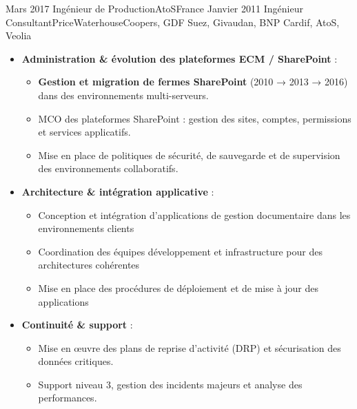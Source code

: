 \begin{experiences}
\consultantexperience
    {Mars 2017}       {Ingénieur de Production}{AtoS}{France}
    {Janvier 2011}    {Ingénieur Consultant}{PriceWaterhouseCoopers, GDF Suez, Givaudan, BNP Cardif, AtoS, Veolia} {
        \begin{itemize}[left=0pt,label={},itemsep=0.4em]
        \vspace{0.3em}  %
          \item \textbf{Administration \& évolution des plateformes ECM / SharePoint} :
            \begin{itemize}[itemsep=0.15em,topsep=0.1em,parsep=0pt]
              \small
              \item \textbf{Gestion et migration de fermes SharePoint} (2010 → 2013 → 2016) dans des environnements multi-serveurs.
              \item MCO des plateformes SharePoint : gestion des sites, comptes, permissions et services applicatifs.
              \item Mise en place de politiques de sécurité, de sauvegarde et de supervision des environnements collaboratifs.
            \end{itemize}
          \vspace{0.1em}
          \item \textbf{Architecture \& intégration applicative} :
            \begin{itemize}[itemsep=0.15em,topsep=0.1em,parsep=0pt]
              \small
              \item Conception et intégration d'applications de gestion documentaire dans les environnements clients
              \item Coordination des équipes développement et infrastructure pour des architectures cohérentes  
              \item Mise en place des procédures de déploiement et de mise à jour des applications
            \end{itemize}
          \vspace{0.1em}
          \item \textbf{Continuité \& support} :
            \begin{itemize}[itemsep=0.15em,topsep=0.1em,parsep=0pt]
              \small
              \item Mise en œuvre des plans de reprise d’activité (DRP) et sécurisation des données critiques.  
              \item Support niveau 3, gestion des incidents majeurs et analyse des performances.  

\end{itemize}
\end{itemize}}
\end{experiences}
